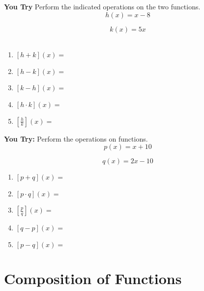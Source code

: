 \documentclass[12pt]{article}
\let\stdsection\section
\renewcommand\section{\newpage\stdsection}
\begin{document}
\pagebreak

\textbf{You Try} Perform the indicated operations on the two functions.\\

$$h(x)=x-8$$

$$k(x)=5x$$\\

\begin{enumerate}
	\item $[h+k](x)=$\\
	
	\item $[h-k](x)=$\\
	
	\item $[k-h](x)=$\\
	
	\item $[h \cdot k](x)=$\\
	
	\item $\left[\frac{h}{k}\right](x)=$\\
\end{enumerate}

\hrulefill

\textbf{You Try:} Perform the operations on functions.\\

$$p(x)=x+10$$

$$q(x)=2x-10$$

\begin{enumerate}
	\item $[p+q](x)=$\\
	
	\item $[p \cdot q](x)=$\\
	
	\item $\left[\frac{p}{q}\right] (x)=$\\
	
	\item $[q-p](x)=$\\
	
	\item $[p-q](x)=$\\
\end{enumerate}





\section{Composition of Functions}
\end{document}
